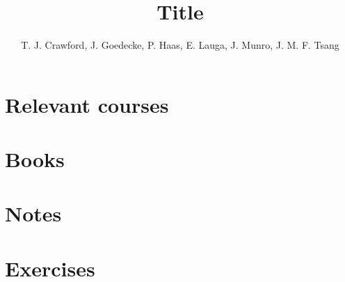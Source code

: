 \documentclass{article}
\title{Title}
\author{T. J. Crawford, J. Goedecke, P. Haas, E. Lauga, J. Munro, J. M. F. Tsang}
\begin{document}
\maketitle

\section{Relevant courses}

\section{Books}


\section{Notes}

\section{Exercises}
\end{document}
